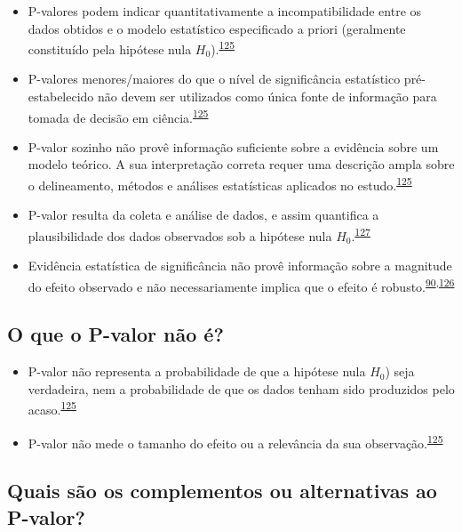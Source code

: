 \documentclass[
  a4paper,
]{book}
\begin{document}
\begin{itemize}
\item
  P-valores podem indicar quantitativamente a incompatibilidade entre os dados obtidos e o modelo estatístico especificado a priori (geralmente constituído pela hipótese nula \(H_{0}\)).\textsuperscript{\protect\hyperlink{ref-wasserstein2016}{125}}
\item
  P-valores menores/maiores do que o nível de significância estatístico pré-estabelecido não devem ser utilizados como única fonte de informação para tomada de decisão em ciência.\textsuperscript{\protect\hyperlink{ref-wasserstein2016}{125}}
\item
  P-valor sozinho não provê informação suficiente sobre a evidência sobre um modelo teórico. A sua interpretação correta requer uma descrição ampla sobre o delineamento, métodos e análises estatísticas aplicados no estudo.\textsuperscript{\protect\hyperlink{ref-wasserstein2016}{125}}
\item
  P-valor resulta da coleta e análise de dados, e assim quantifica a plausibilidade dos dados observados sob a hipótese nula \(H_{0}\).\textsuperscript{\protect\hyperlink{ref-heinze2016}{127}}
\item
  Evidência estatística de significância não provê informação sobre a magnitude do efeito observado e não necessariamente implica que o efeito é robusto.\textsuperscript{\protect\hyperlink{ref-Landis2012}{90},\protect\hyperlink{ref-altman2017}{126}}
\end{itemize}

\hypertarget{o-que-o-p-valor-nuxe3o-uxe9}{%
\subsection{O que o P-valor não é?}\label{o-que-o-p-valor-nuxe3o-uxe9}}

\begin{itemize}
\item
  P-valor não representa a probabilidade de que a hipótese nula \(H_{0}\)) seja verdadeira, nem a probabilidade de que os dados tenham sido produzidos pelo acaso.\textsuperscript{\protect\hyperlink{ref-wasserstein2016}{125}}
\item
  P-valor não mede o tamanho do efeito ou a relevância da sua observação.\textsuperscript{\protect\hyperlink{ref-wasserstein2016}{125}}
\end{itemize}

\hypertarget{quais-suxe3o-os-complementos-ou-alternativas-ao-p-valor}{%
\subsection{Quais são os complementos ou alternativas ao P-valor?}\label{quais-suxe3o-os-complementos-ou-alternativas-ao-p-valor}}
\end{document}
